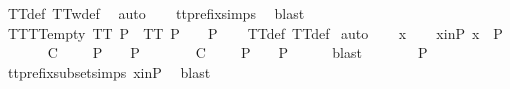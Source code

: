 \begin{isabellebody}
\ TT{}{\isacharunderscore}def\ TT{}w{\isacharunderscore}def\ \isamarkupfalse%
\ auto\isanewline
\ \ \isamarkupfalse%
\ tt{\isacharunderscore}prefix{\isachardot}simps{\isacharparenleft}{}{\isacharparenright}\ \isamarkupfalse%
\ blast%
\endisatagproof
{\isafoldproof}%
%
\isadelimproof
\isanewline
%
\endisadelimproof
\isanewline
{}\isamarkupfalse%
\ TT{}{\isacharunderscore}TT{}{\isacharunderscore}empty{\isacharcolon}\ {\isachardoublequoteopen}TT{}\ P\ {\isasymLongrightarrow}\ TT{}\ P\ {\isasymLongrightarrow}\ {\isacharbrackleft}{\isacharbrackright}\ {\isasymin}\ P{\isachardoublequoteclose}\isanewline
%
\isadelimproof
\ \ %
\endisadelimproof
%
\isatagproof
{}\isamarkupfalse%
\ TT{}{\isacharunderscore}def\ TT{}{\isacharunderscore}def\isanewline
{}\isamarkupfalse%
\ auto\isanewline
\ \ \isamarkupfalse%
\ x\isanewline
\ \ \isamarkupfalse%
\ x{\isacharunderscore}in{\isacharunderscore}P{\isacharcolon}\ {\isachardoublequoteopen}x\ {\isasymin}\ P{\isachardoublequoteclose}\isanewline
\ \ \isamarkupfalse%
\ {\isachardoublequoteopen}{\isasymforall}{\isasymrho}{\isachardot}\ {\isacharparenleft}{\isasymexists}{\isasymsigma}{\isachardot}\ {\isasymrho}\ {\isasymlesssim}\isactrlsub C\ {\isasymsigma}\ {\isasymand}\ {\isasymsigma}\ {\isasymin}\ P{\isacharparenright}\ {\isasymlongrightarrow}\ {\isasymrho}\ {\isasymin}\ P{\isachardoublequoteclose}\isanewline
\ \ \isamarkupfalse%
\ \isamarkupfalse%
\ {\isachardoublequoteopen}{\isacharparenleft}{\isasymexists}{\isasymsigma}{\isachardot}\ {\isacharbrackleft}{\isacharbrackright}\ {\isasymlesssim}\isactrlsub C\ {\isasymsigma}\ {\isasymand}\ {\isasymsigma}\ {\isasymin}\ P{\isacharparenright}\ {\isasymlongrightarrow}\ {\isacharbrackleft}{\isacharbrackright}\ {\isasymin}\ P{\isachardoublequoteclose}\isanewline
\ \ \ \ \isamarkupfalse%
\ blast\isanewline
\ \ \isamarkupfalse%
\ \isamarkupfalse%
\ {\isachardoublequoteopen}{\isacharbrackleft}{\isacharbrackright}\ {\isasymin}\ P{\isachardoublequoteclose}\isanewline
\ \ \ \ \isamarkupfalse%
\ tt{\isacharunderscore}prefix{\isacharunderscore}subset{\isachardot}simps{\isacharparenleft}{}{\isacharparenright}\ x{\isacharunderscore}in{\isacharunderscore}P\ \isamarkupfalse%
\ blast\isanewline
\ \ \isamarkupfalse%

\end{isabellebody}
